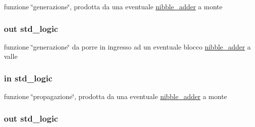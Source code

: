 funzione \char`\"{}generazione\char`\"{}, prodotta da una eventuale \hyperlink{classnibble__adder}{nibble\+\_\+adder} a monte 

\hypertarget{group___nibble_adder_ga068cd5c4d23e284cb942702252ed1491}{
\subsubsection[{genout}]{ {\bfseries \textcolor{vhdlchar}{out}\textcolor{vhdlchar}{ }} {\bfseries \textcolor{vhdlchar}{std\+\_\+logic}\textcolor{vhdlchar}{ }} \hspace{0.3cm}{\ttfamily [Port]}}}\label{group___nibble_adder_ga068cd5c4d23e284cb942702252ed1491}


funzione \char`\"{}generazione\char`\"{} da porre in ingresso ad un eventuale blocco \hyperlink{classnibble__adder}{nibble\+\_\+adder} a valle 

\hypertarget{group___nibble_adder_ga422e8e7ee01fc7ac7b7390cd2ad8c87b}{
\subsubsection[{propin}]{ {\bfseries \textcolor{vhdlchar}{in}\textcolor{vhdlchar}{ }} {\bfseries \textcolor{vhdlchar}{std\+\_\+logic}\textcolor{vhdlchar}{ }} \hspace{0.3cm}{\ttfamily [Port]}}}\label{group___nibble_adder_ga422e8e7ee01fc7ac7b7390cd2ad8c87b}


funzione \char`\"{}propagazione\char`\"{}, prodotta da una eventuale \hyperlink{classnibble__adder}{nibble\+\_\+adder} a monte 

\hypertarget{group___nibble_adder_ga5957c9cdd706cafd2da8855133a002c9}{
\subsubsection[{propout}]{ {\bfseries \textcolor{vhdlchar}{out}\textcolor{vhdlchar}{ }} {\bfseries \textcolor{vhdlchar}{std\+\_\+logic}\textcolor{vhdlchar}{ }} \hspace{0.3cm}{\ttfamily [Port]}}}\label{group___nibble_adder_ga5957c9cdd706cafd2da8855133a002c9}


